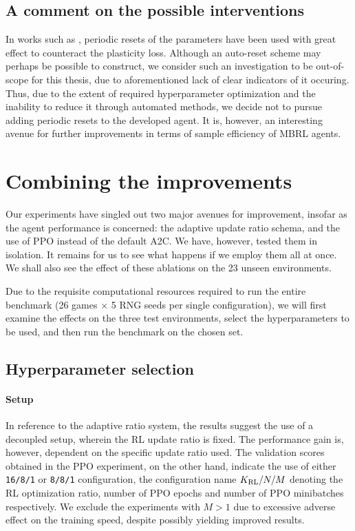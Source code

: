 \documentclass[en]{pracamgr}
\begin{document}
\subsection{A comment on the possible interventions}

In works such as \autocite{doroSampleEfficientReinforcementLearning2022,schwarzerBiggerBetterFaster2023}, periodic resets of the parameters have been used with great effect to counteract the plasticity loss. Although an auto-reset scheme may perhaps be possible to construct, we consider such an investigation to be out-of-scope for this thesis, due to aforementioned lack of clear indicators of it occuring. Thus, due to the extent of required hyperparameter optimization and the inability to reduce it through automated methods, we decide not to pursue adding periodic resets to the developed agent. It is, however, an interesting avenue for further improvements in terms of sample efficiency of MBRL agents.

\section{Combining the improvements}

Our experiments have singled out two major avenues for improvement, insofar as the agent performance is concerned: the adaptive update ratio schema, and the use of PPO instead of the default A2C. We have, however, tested them in isolation. It remains for us to see what happens if we employ them all at once. We shall also see the effect of these ablations on the 23 unseen environments.

Due to the requisite computational resources required to run the entire benchmark (26 games $\times$ 5 RNG seeds per single configuration), we will first examine the effects on the three test environments, select the hyperparameters to be used, and then run the benchmark on the chosen set.

\subsection{Hyperparameter selection}

\paragraph{Setup} In reference to the adaptive ratio system, the results suggest the use of a decoupled setup, wherein the RL update ratio is fixed. The performance gain is, however, dependent on the specific update ratio used. The validation scores obtained in the PPO experiment, on the other hand, indicate the use of either {\tt 16/8/1} or {\tt 8/8/1} configuration, the configuration name $K_{\rm RL}/N/M$ denoting the RL optimization ratio, number of PPO epochs and number of PPO minibatches respectively. We exclude the experiments with $M > 1$ due to excessive adverse effect on the training speed, despite possibly yielding improved results.
\end{document}
